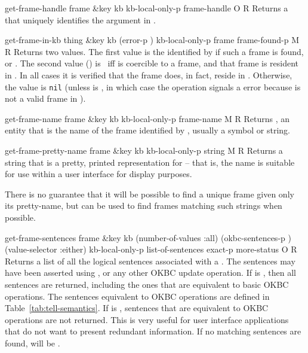 \begin{okbcop}{get-frame-handle}{ frame \&key kb kb-local-only-p} { frame-handle } { O } { R } {  }
Returns a  that uniquely identifies the 
   argument in .
\end{okbcop}

\begin{okbcop}{get-frame-in-kb}{ thing \&key kb (error-p \true) kb-local-only-p} { frame frame-found-p } { M } { R } {  }
Returns two values.  The first value is the 
   identified by  if such a frame is found, or \false.
   The second value () is \true\ iff  is
   coercible to a frame, and that frame is resident in .  In
   all cases it is verified that the frame does, in fact, reside in .
   Otherwise, the  value is {\tt nil} (unless 
    is \true, in which case the operation signals a
    error because
    is not a valid frame in ).
\end{okbcop}

\begin{okbcop}{get-frame-name}{ frame \&key kb kb-local-only-p} { frame-name } { M } { R } {  }
Returns , an entity that is the name of the frame
   identified by , usually a symbol or string.
\end{okbcop}

\begin{okbcop}{get-frame-pretty-name}{ frame \&key kb kb-local-only-p} { string } { M } { R } {  }
Returns a string that is a pretty, printed representation for 
   -- that is, the name is suitable for use within a user interface for
   display purposes.

   There is no guarantee that it will be possible to find a unique frame
   given only its pretty-name, but  can be used to
   find frames matching such strings when possible.
\end{okbcop}

\begin{okbcop}{get-frame-sentences}{ frame \&key kb (number-of-values :all) (okbc-sentences-p \true) (value-selector :either) kb-local-only-p} { list-of-sentences exact-p more-status } { O } { R } {  }
Returns a list of all the logical sentences associated with a .
   The sentences may have been asserted using , or any other
   OKBC update operation.  If  is \true, then all
   sentences are returned, including the ones that are equivalent to
   basic OKBC operations.  The sentences equivalent to OKBC operations are
   defined in Table~\ref{tab:tell-semantics}.  If  is
   \false, sentences that are equivalent to OKBC operations are not
   returned.  This is very useful for user interface applications that do not
   want to present redundant information.  If no matching sentences are
   found,  will be \emptylist.
\end{okbcop}

